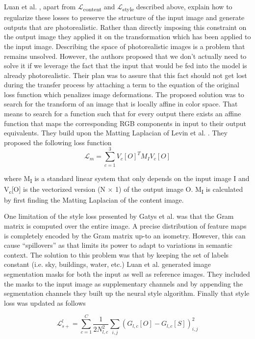 \documentclass[runningheads]{llncs}
\begin{document}
Luan et al. \cite{luan2017deep}, apart from $\mathcal{L}$\textsubscript{content} and $\mathcal{L}$\textsubscript{style} described above, explain how to regularize these losses to preserve the structure of the input image and generate outputs that are photorealistic. Rather than directly imposing this constraint on the output image they applied it on the transformation which has been applied to the input image. Describing the space of photorealistic images is a problem that remains unsolved. However, the authors proposed that we don't actually need to solve it if we leverage the fact that the input that would be fed into the model is already photorealistic. Their plan was to assure that this fact should not get lost during the transfer process by attaching a term to the equation of the original loss function which penalizes image deformations. The proposed solution was to search for the transform of an image that is locally affine in color space. That means to search for a function such that for every output there exists an affine function that maps the corresponding RGB components in input to their output equivalents. They build upon the Matting Laplacian of Levin et al. \cite{levin2006closed}. They proposed the following loss function
\[\mathcal{L}_m = \sum_{c = 1}^3 V_c [O]^T M_I V_c [O] \]

where M\textsubscript{I} is a standard linear system that only depends on the input image I and V\textsubscript{c}[O] is the vectorized version (N × 1) of the output image O. M\textsubscript{I} is calculated by first finding the Matting Laplacian of the content image.

One limitation of the style loss presented by Gatys et al. \cite{gatys2016image} was that  the Gram matrix is computed over the entire image. A precise distribution of feature maps is completely encoded by the Gram matrix up-to an isometry. However, this can cause “spillovers” as that limits its power to adapt to variations in semantic context. The solution to this problem was that by keeping the set of labels constant (i.e. sky, buildings, water, etc.) Luan et al. \cite{luan2017deep} generated image segmentation masks for both the input as well as reference images. They included the masks to the input image as supplementary channels and by appending the segmentation channels they built up the neural style algorithm. Finally that style loss was updated as follows

\[ \mathcal{L}_{s+}^l = \sum_{c = 1}^C \frac{1}{2N_{l,c}^2} \sum_{i,j} (G_{l,c}[O]-G_{l,c}[S])_{i,j}^2 \]
\end{document}
